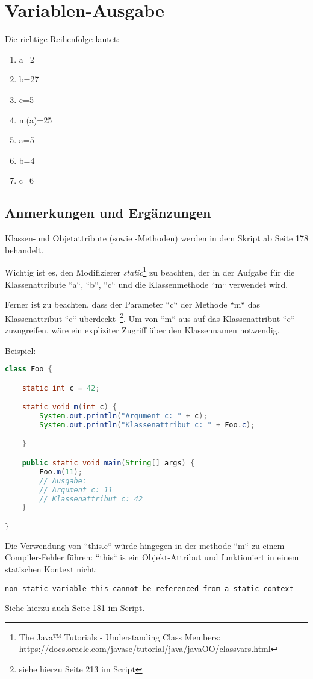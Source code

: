 \chapter{Variablen-Ausgabe}

Die richtige Reihenfolge lautet:

\begin{enumerate}
    \item a=2
    \item b=27
    \item c=5
    \item m(a)=25
    \item a=5
    \item b=4
    \item c=6
\end{enumerate}


\section*{Anmerkungen und Ergänzungen}

Klassen-und Objetattribute (sowie -Methoden) werden in dem Skript ab Seite 178 behandelt.

Wichtig ist es, den Modifizierer \textit{static}\footnote{
    The Java™ Tutorials - Understanding Class Members: \url{https://docs.oracle.com/javase/tutorial/java/javaOO/classvars.html}
} zu beachten, der in der Aufgabe für die Klassenattribute ``a``, ``b``, ``c`` und die Klassenmethode ``m`` verwendet wird.

Ferner ist zu beachten, dass der Parameter ``c`` der Methode ``m`` das Klassenattribut ``c`` überdeckt~\footnote{siehe hierzu Seite 213 im Script}.
Um von ``m`` aus auf das Klassenattribut ``c`` zuzugreifen, wäre ein expliziter Zugriff über den Klassennamen notwendig.

Beispiel:

\begin{lstlisting}[language=java]
class Foo {

    static int c = 42;

    static void m(int c) {
        System.out.println("Argument c: " + c);
        System.out.println("Klassenattribut c: " + Foo.c);

    }

    public static void main(String[] args) {
        Foo.m(11);
        // Ausgabe:
        // Argument c: 11
        // Klassenattribut c: 42
    }

}
\end{lstlisting}

Die Verwendung von ``this.c`` würde hingegen in der methode ``m`` zu einem Compiler-Fehler führen: ``this`` is ein
Objekt-Attribut und funktioniert in einem statischen Kontext nicht:

\begin{lstlisting}[language=text]
non-static variable this cannot be referenced from a static context
\end{lstlisting}

Siehe hierzu auch Seite 181 im Script.

